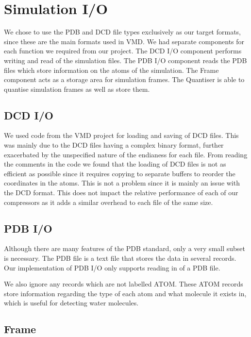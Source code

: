 \documentclass[a4paper,11pt]{report}
\begin{document}
\section{Simulation I/O}

We chose to use the PDB and DCD file types exclusively as our target formats, since these are the main formats used in VMD. We had separate components for each function we required from our project. The DCD I/O component performs writing and read of the simulation files. The PDB I/O component reads the PDB files which store information on the atoms of the simulation. The Frame component acts as a storage area for simulation frames. The Quantiser is able to quantise simulation frames as well as store them.

\subsection{DCD I/O}

We used code from the VMD project for loading and saving of DCD files. This was mainly due to the DCD files having a complex binary format, further exacerbated by the unspecified nature of the endianess for each file. From reading the comments in the code we found that the loading of DCD files is not as efficient as possible since it requires copying to separate buffers to reorder the coordinates in the atoms. This is not a problem since it is mainly an issue with the DCD format. This does not impact the relative performance of each of our compressors as it adds a similar overhead to each file of the same size.

\subsection{PDB I/O}

Although there are many features of the PDB standard, only a very small subset is necessary. The PDB file is a text file that stores the data in several records. Our implementation of PDB I/O only supports reading in of a PDB file. 

We also ignore any records which are not labelled ATOM. These ATOM records store information regarding the type of each atom and what molecule it exists in, which is useful for detecting water molecules.

\subsection{Frame}
\end{document}

